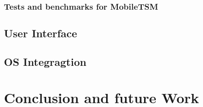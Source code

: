 \documentclass[11pt,a4paper]{scrreprt}
\begin{document}
\subsection{Tests and benchmarks for MobileTSM}
\label{sub:routing_testcase}


\section{User Interface} %
\label{sec:user_interface}


\section{OS Integragtion} %
\label{sec:android_integration}


\chapter{Conclusion and future Work} %
\label{chp:platform_choice}


%
%
\end{document}
